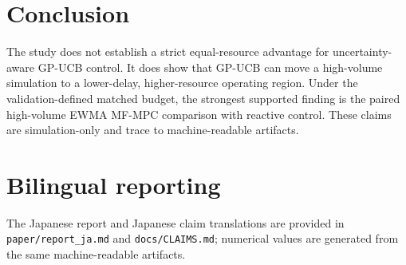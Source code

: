 \documentclass[10pt]{article}
\begin{document}
\section{Conclusion}
The study does not establish a strict equal-resource advantage for uncertainty-aware GP-UCB control. It does show that GP-UCB can move a high-volume simulation to a lower-delay, higher-resource operating region. Under the validation-defined matched budget, the strongest supported finding is the paired high-volume EWMA MF-MPC comparison with reactive control. These claims are simulation-only and trace to machine-readable artifacts.
\section{Bilingual reporting}
The Japanese report and Japanese claim translations are provided in \texttt{paper/report\_ja.md} and \texttt{docs/CLAIMS.md}; numerical values are generated from the same machine-readable artifacts.


\end{document}
